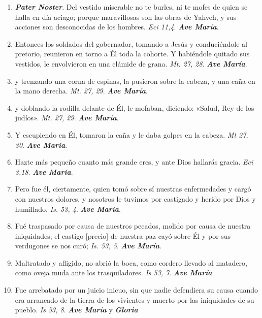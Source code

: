 \documentclass[../../devocionario.tex]{subfiles}
\begin{document}
    \begin{enumerate}
    
        \item \textbf{\emph{Pater Noster}}. Del vestido miserable no te burles, ni te mofes de quien se halla en día aciago; 
            porque maravillosas son las obras de Yahveh, y sus acciones son desconocidas de los hombres. \emph{Eci 11,4}. \textbf{\emph{Ave María}}.

        \item Entonces los soldados del gobernador, tomando a Jesús y conduciéndole al pretorio, reunieron en torno a Él toda la cohorte. 
            Y habiéndole quitado sus vestidos, le envolvieron en una clámide de grana. \emph{Mt. 27, 28}. \textbf{\emph{Ave María}}.

        \item y trenzando una corna de espinas, la pusieron sobre la cabeza, y una caña en la mano derecha. \emph{Mt. 27, 29}. \textbf{\emph{Ave María}}.

        \item y doblando la rodilla delante de Él, le mofaban, diciendo: «Salud, Rey de los judíos». \emph{Mt. 27, 29}. \textbf{\emph{Ave María}}.

        \item Y escupiendo en Él, tomaron la caña y le daba golpes en la cabeza. \emph{Mt 27, 30}. \textbf{\emph{Ave María}}.

        \item Hazte más pequeño cuanto más grande eres, y ante Dios hallarás gracia. \emph{Eci 3,18}. \textbf{\emph{Ave María}}.
        
        \item Pero fue él, ciertamente, quien tomó sobre sí nuestras enfermedades y cargó con nuestros dolores, y nosotros
            le tuvimos por castigado y herido por Dios y humillado. \emph{Is. 53, 4}. \textbf{\emph{Ave María}}.

        \item Fué traspasado por causa de nuestros pecados, molido por causa de nuestra iniquidades; 
            el castigo [precio] de nuestra paz cayó sobre Él y por sus verdugones se nos curó; \emph{Is. 53, 5}. \textbf{\emph{Ave María}}.

        \item Maltratado y afligido, no abrió la boca, como cordero llevado al matadero, como oveja muda ante los trasquiladores. \emph{Is 53, 7}. \textbf{\emph{Ave María}}.

        \item Fue arrebatado por un juicio inicuo, sin que nadie defendiera su causa cuando era arrancado de la tierra de los vivientes y muerto por las iniquidades de su pueblo.
            \emph{Is 53, 8}. \textbf{\emph{Ave María}} y \textbf{\emph{Gloria}}

    \end{enumerate}
\end{document}
